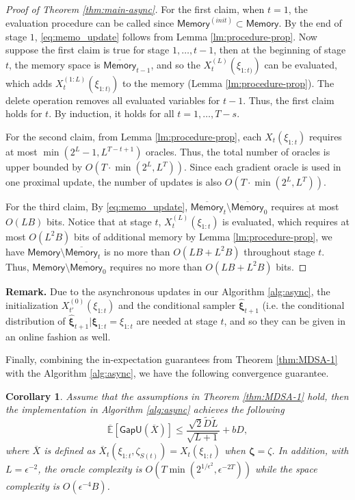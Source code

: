 \documentclass[11pt,fullpage,letterpaper]{article}
\newcommand{\E}{\mathbb{E}}
\newcommand{\bx}{\boldsymbol{\xi}}
\newcommand{\bz}{\boldsymbol{\zeta}}
\newcommand{\gapu}{\mathsf{GapU}}
\newcommand{\memo}{\mathsf{Memory}}
\newtheorem{corollary}{Corollary}[section]
\begin{document}
\begin{proof}[Proof of Theorem \ref{thm:main-async}]
For the first claim, when $t=1$, the evaluation procedure can be called since $\memo^{(init)}\subset \memo$. By the end of stage $1$, \eqref{eq:memo_update} follows from Lemma \ref{lm:procedure-prop}. Now suppose the first claim is true for stage $1,\ldots,t-1$, then at the beginning of stage $t$, the memory space is $\overline{\memo}_{t-1}$, and so the $X_t^{(L)}(\xi_{1:t)})$ can be evaluated, which adds $X_t^{(1:L)}(\xi_{1:t)})$ to the memory (Lemma \ref{lm:procedure-prop}). The delete operation removes all evaluated variables for $t-1$. Thus, the first claim holds for $t$. By induction, it holds for all $t=1,\ldots,T-s$. 



For the second claim, from Lemma \ref{lm:procedure-prop}, each $X_t(\xi_{1:t})$ requires at most $\min(2^L-1,L^{T-t+1})$ oracles. Thus, the total number of oracles is upper bounded by $O(T \cdot \min(2^L,L^T))$. Since each gradient oracle is used in one proximal update, the number of updates is also $O(T \cdot \min(2^L,L^T))$. 

For the third claim,  By \eqref{eq:memo_update}, $\overline{\memo}_t\setminus \overline{\memo}_0$ requires at most $O(LB) $ bits. Notice that at stage $t$, $X_t^{(L)}(\xi_{1:t})$ is evaluated, which requires at most $O(L^2B)$ bits of additional memory by Lemma \ref{lm:procedure-prop}, we have $\memo\setminus \overline{\memo}_t$ is no more than $O(LB +L^2B)$ throughout stage $t$. Thus, $\memo\setminus \overline{\memo}_0$ requires no more than $O(LB +L^2B)$ bits. 
\end{proof}







\textbf{Remark.} Due to the asynchronous updates in our Algorithm \ref{alg:async}, the initialization $X_{t'}^{(0)}(\xi_{1:t})$ and the conditional sampler $\widehat{\bx}_{t+1}$ (i.e. the conditional distribution of $\widehat{\bx}_{t+1}|\bx_{1:t} = \xi_{1:t}$ are needed at stage $t$, and so they can be given in an online fashion as well. 




Finally, combining the in-expectation guarantees from Theorem \ref{thm:MDSA-1} with the Algorithm \ref{alg:async}, we have the following convergence guarantee. 
\begin{corollary}\label{cor:overall}
    Assume that the assumptions in Theorem \ref{thm:MDSA-1} hold, then the implementation in Algorithm \ref{alg:async} achieves the following
\begin{displaymath}
    \overline{\E}[\gapu(\overline{X})]\leq \frac{\sqrt{2}\tilde{D}\tilde{L}}{\sqrt{L+1}}+bD,
\end{displaymath}
where $\overline{X}$ is defined as $\overline{X}_t(\xi_{1:t},\zeta_{S(t)}) = X_t(\xi_{1:t})$ when $\bz = \zeta$. In addition, with $L = \epsilon^{-2}$, the oracle complexity is $O(T\min(2^{1/\epsilon^2},\epsilon^{-2T}))$ while the space complexity is $O(\epsilon^{-4}B)$. 
\end{corollary}
\end{document}
